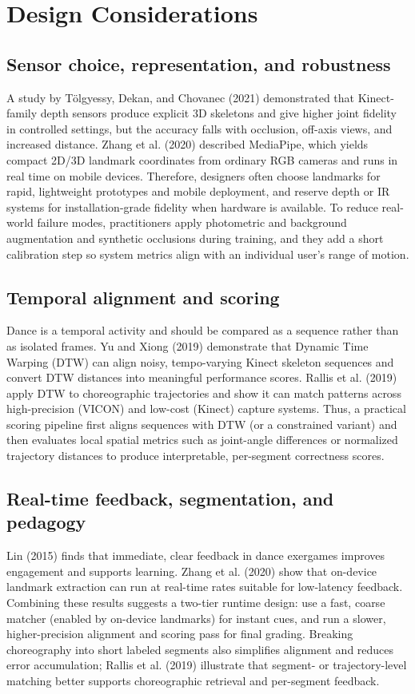 \section{Design Considerations}

\subsection{Sensor choice, representation, and robustness}
A study by Tölgyessy, Dekan, and Chovanec (2021) demonstrated that Kinect-family depth sensors produce explicit 3D skeletons and give higher joint fidelity in controlled settings, but the accuracy falls with occlusion, off-axis views, and increased distance. Zhang et al. (2020) described MediaPipe, which yields compact 2D/3D landmark coordinates from ordinary RGB cameras and runs in real time on mobile devices. Therefore, designers often choose landmarks for rapid, lightweight prototypes and mobile deployment, and reserve depth or IR systems for installation-grade fidelity when hardware is available. To reduce real-world failure modes, practitioners apply photometric and background augmentation and synthetic occlusions during training, and they add a short calibration step so system metrics align with an individual user’s range of motion.

\subsection{Temporal alignment and scoring}
Dance is a temporal activity and should be compared as a sequence rather than as isolated frames. Yu and Xiong (2019) demonstrate that Dynamic Time Warping (DTW) can align noisy, tempo-varying Kinect skeleton sequences and convert DTW distances into meaningful performance scores. Rallis et al. (2019) apply DTW to choreographic trajectories and show it can match patterns across high-precision (VICON) and low-cost (Kinect) capture systems. Thus, a practical scoring pipeline first aligns sequences with DTW (or a constrained variant) and then evaluates local spatial metrics such as joint-angle differences or normalized trajectory distances to produce interpretable, per-segment correctness scores.

\subsection{Real-time feedback, segmentation, and pedagogy}
Lin (2015) finds that immediate, clear feedback in dance exergames improves engagement and supports learning. Zhang et al. (2020) show that on-device landmark extraction can run at real-time rates suitable for low-latency feedback. Combining these results suggests a two-tier runtime design: use a fast, coarse matcher (enabled by on-device landmarks) for instant cues, and run a slower, higher-precision alignment and scoring pass for final grading. Breaking choreography into short labeled segments also simplifies alignment and reduces error accumulation; Rallis et al. (2019) illustrate that segment- or trajectory-level matching better supports choreographic retrieval and per-segment feedback.


